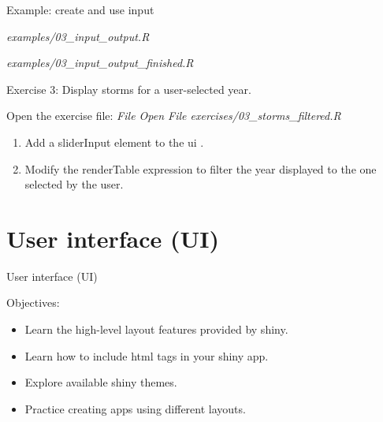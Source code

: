 \documentclass[
  12pt,
  ignorenonframetext,
]{beamer}
\providecommand{\tightlist}{%
  \setlength{\itemsep}{0pt}\setlength{\parskip}{0pt}}
\begin{document}
\begin{frame}{Example: create and use input}
\protect\hypertarget{example-create-and-use-input}{}

\begin{description}
\tightlist
\item[Start]
\emph{examples/03\_input\_output.R}
\item[Finished]
\emph{examples/03\_input\_output\_finished.R}
\end{description}

\end{frame}

\begin{frame}{Exercise 3: Display storms for a user-selected year.}
\protect\hypertarget{exercise-3-display-storms-for-a-user-selected-year.}{}

Open the exercise file: \emph{File \rightarrow Open File
\rightarrow exercises/03\_storms\_filtered.R}

\begin{enumerate}
\item
  Add a sliderInput element to the ui .
\item
  Modify the renderTable expression to filter the year displayed to the
  one selected by the user.
\end{enumerate}

\end{frame}

\hypertarget{user-interface-ui}{%
\section{User interface (UI)}\label{user-interface-ui}}

\begin{frame}{User interface (UI)}

Objectives:

\begin{itemize}
\item
  Learn the high-level layout features provided by shiny.
\item
  Learn how to include html tags in your shiny app.
\item
  Explore available shiny themes.
\item
  Practice creating apps using different layouts.
\end{itemize}

\end{frame}
\end{document}
